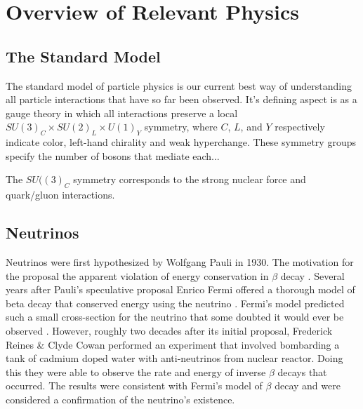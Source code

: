 
\chapter{Overview of Relevant Physics}

\ifpdf
    \graphicspath{{physics/figures/PNG/}{physics/figures/PDF/}{physics/figures/}}
\else
    \graphicspath{{physics/figures/EPS/}{physics/figures/}}
\fi

\section{The Standard Model}
The standard model of particle physics is our current best way of understanding
all particle interactions that have so far been observed.
It's defining aspect is as a gauge theory in which all interactions
preserve a local $SU{(3)}_C \times SU{(2)}_L \times U{(1)}_Y$ symmetry, where
$C$, $L$, and $Y$ respectively indicate color, left-hand chirality and weak hyperchange.
These symmetry groups specify the number of bosons that mediate each...

The $SU({(3)}_C$ symmetry corresponds to the strong nuclear force and quark/gluon
interactions.

\section{Neutrinos}
Neutrinos were first hypothesized by Wolfgang Pauli in 1930.
The motivation for the proposal the apparent violation of energy
conservation in $\beta$ decay \citep{pauli_letter}.
Several years after Pauli's speculative proposal Enrico Fermi offered
a thorough model of beta decay that conserved energy using the neutrino
\citep{fermi_beta_decay}.
Fermi's model predicted such a small cross-section for the neutrino that some
doubted it would ever be observed \citep{bethe_impossible_to_observe}.
However, roughly two decades after its initial proposal, Frederick Reines \&
Clyde Cowan performed an experiment that involved bombarding a tank of cadmium
doped water with anti-neutrinos from nuclear reactor.
Doing this they were able to observe the rate and energy of inverse $\beta$
decays that occurred.
The results were consistent with Fermi's model of $\beta$ decay and were
considered a confirmation of the neutrino's existence.

